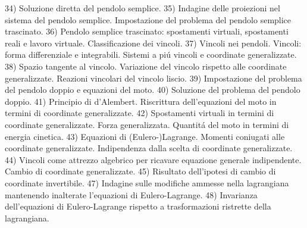 \begin{multicols}{3}
  34) Soluzione diretta del pendolo semplice.
  35) Indagine delle proiezioni nel sistema del pendolo semplice. Impostazione
  del problema del pendolo semplice trascinato.
  36) Pendolo semplice trascinato: spostamenti virtuali, spostamenti reali e
  lavoro virtuale. Classificazione dei vincoli.
  37) Vincoli nei pendoli. Vincoli: forma differenziale e integrabili. Sistemi
  a pi\'u vincoli e coordinate generalizzate.
  38) Spazio tangente al vincolo. Variazione del vincolo rispetto alle
  coordinate generalizzate. Reazioni vincolari del vincolo liscio.
  39) Impostazione del problema del pendolo doppio e equazioni del moto.
  40) Soluzione del problema del pendolo doppio.
  41) Principio di d'Alembert. Riscrittura dell'equazioni del moto in termini
  di coordinate generalizzate.
  42) Spostamenti virtuali in termini di coordinate generalizzate. Forza
  generalizzata. Quantit\'a del moto in termini di energia cinetica.
  43) Equazioni di (Eulero-)Lagrange. Momenti coniugati alle coordinate
  generalizzate. Indipendenza dalla scelta di coordinate generalizzate.
  44) Vincoli come attrezzo algebrico per ricavare equazione generale
  indipendente. Cambio di coordinate generalizzate.
  45) Risultato dell'ipotesi di cambio di coordinate invertibile.
  47) Indagine sulle modifiche ammesse nella lagrangiana mantenendo inalterate
  l'equazioni di Eulero-Lagrange.
  48) Invarianza dell'equazioni di Eulero-Lagrange rispetto a trasformazioni
  ristrette della lagrangiana.

\end{multicols}
